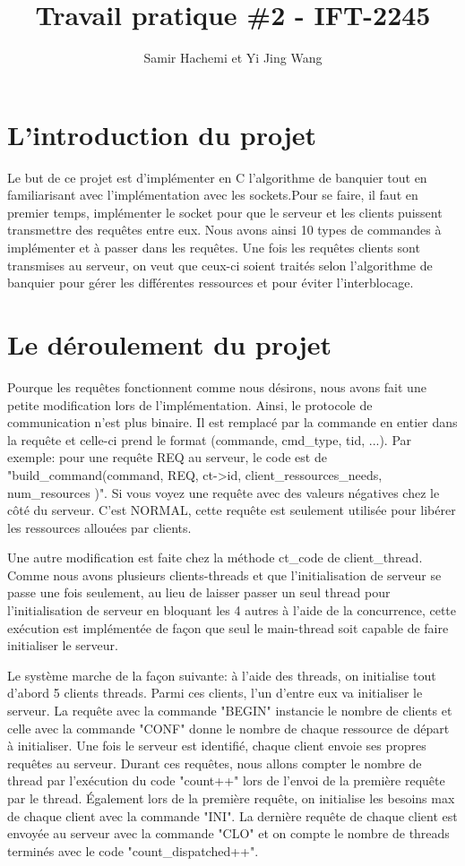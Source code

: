 \documentclass[11pt]{article}
\title{Travail pratique \#2 - IFT-2245}
\author{Samir Hachemi et Yi Jing Wang}
\begin{document}
\maketitle

\section{L'introduction du projet}
Le but de ce projet est d'implémenter en C l'algorithme de banquier tout en familiarisant avec l'implémentation avec les sockets.Pour se faire, il faut en premier temps, implémenter le socket pour que le serveur et les clients puissent transmettre des requêtes entre eux. Nous avons ainsi 10 types de commandes à implémenter et à passer dans les requêtes. Une fois les requêtes clients sont transmises au serveur, on veut que ceux-ci soient traités selon l'algorithme de banquier pour gérer les différentes ressources et pour éviter l'interblocage.

\section{Le déroulement du projet}
Pourque les requêtes fonctionnent comme nous désirons, nous avons fait une petite modification lors de l'implémentation. Ainsi, le protocole de communication n'est plus binaire. Il est remplacé par la commande en entier dans la requête et celle-ci prend le format (commande, cmd\_type, tid, ...). Par exemple: pour une requête REQ au serveur, le code est de "build\_command(command, REQ, ct->id, client\_ressources\_needs, num\_resources )". Si vous voyez une requête avec des valeurs négatives chez le côté du serveur. C'est NORMAL, cette requête est seulement utilisée pour libérer les ressources allouées par clients. 

Une autre modification est faite chez la méthode ct\_code de client\_thread. Comme nous avons plusieurs clients-threads et que l'initialisation de serveur se passe une fois seulement, au lieu de laisser passer un seul thread pour l'initialisation de serveur en bloquant les 4 autres à l'aide de la concurrence, cette exécution est implémentée de façon que seul le main-thread soit capable de faire initialiser le serveur. 

Le système marche de la façon suivante: à l'aide des threads, on initialise tout d'abord 5 clients threads. Parmi ces clients, l'un d'entre eux va initialiser le serveur. La requête avec la commande "BEGIN" instancie le nombre de clients et celle avec la commande "CONF" donne le nombre de chaque ressource de départ à initialiser.
Une fois le serveur est identifié, chaque client envoie ses propres requêtes au serveur. Durant ces requêtes, nous allons compter le nombre de thread par l'exécution du code "count++" lors de l'envoi de la première requête par le thread. Également lors de la première requête, on initialise les besoins max de chaque client avec la commande "INI". La dernière requête de chaque client est envoyée au serveur avec la commande "CLO" et on compte le nombre de threads terminés avec le code "count\_dispatched++".
\end{document}

